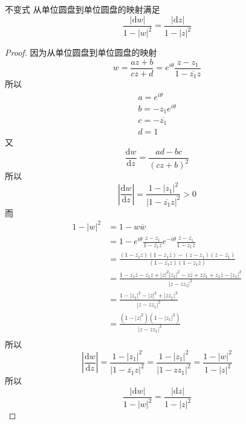 \begin{corollary*}{不变式}
    从单位圆盘到单位圆盘的映射满足
    \[
    \frac{|\mathrm{d}w|}{1-|w|^2} = \frac{|\mathrm{d}z|}{1-|z|^2}
    \]
\end{corollary*}
\begin{proof}
因为从单位圆盘到单位圆盘的映射
\[
w = \frac{az+b}{cz+d} = e^{i\theta}\frac{z-z_1}{1-\overline{z_1}z}
\]
所以
\begin{gather*}
a = e^{i\theta} \\
b = -z_1e^{i\theta}\\
c = -\overline{z_1} \\
d = 1
\end{gather*}
又
\[
\frac{\mathrm{d}w}{\mathrm{d}z} = \frac{ad-bc}{(cz+b)^2}
\]
所以
\[
\left|\frac{\mathrm{d}w}{\mathrm{d}z}\right| = \frac{1-|z_1|^2}{|1-\overline{z_1}z|^2} > 0
\]
而
\[
\begin{split}
1-|w|^2 &= 1-w\overline{w}\\
&= 1 - e^{i\theta}\frac{z-z_1}{1-\overline{z_1}z}e^{-i\theta}\frac{\overline{z}-\overline{z_1}}{1-z_1\overline{z}} \\
&= \frac{(1-\overline{z_1}z)(1-z_1\overline{z}) - (z-z_1)(\overline{z}-\overline{z_1})}
{(1-\overline{z_1}z)(1-z_1\overline{z})} \\
&= \frac{1-z_1\overline{z}-\overline{z_1}z+|z|^2|z_1|^2-z\overline{z}+z\overline{z_1}+z_1\overline{z}-|z_1|^2}{|z-zz_1|^2} \\
&= \frac{1-|z_1|^2-|z|^2+|zz_1|^2}
{|z-zz_1|^2} \\
&= \frac{(1-|z|^2)(1-|z_1|^2)}
{|z-zz_1|^2}\\
\end{split}
\]
所以
\[
\left|\frac{\mathrm{d}w}{\mathrm{d}z}\right|
= \frac{1-|z_1|^2}{|1-\overline{z_1}z|^2}
 = \frac{1-|z_1|^2}{|1-zz_1|^2} = \frac{1-|w|^2}{1-|z|^2}
\]
所以
\[
\frac{|\mathrm{d}w|}{1-|w|^2} = \frac{|\mathrm{d}z|}{1-|z|^2}
\]
\end{proof}

